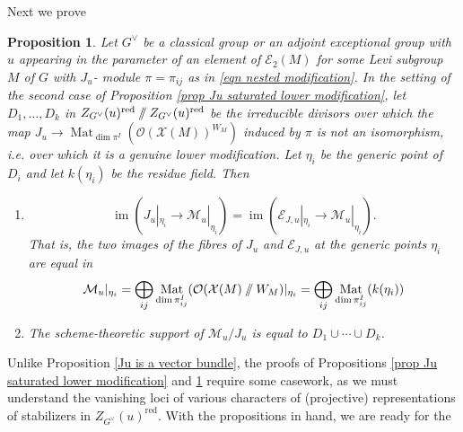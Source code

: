 \documentclass[10pt]{article}
\DeclareMathOperator{\im}{\mathrm{im}}
\DeclareMathOperator{\Mat}{Mat}
\newcommand{\git}{\mathbin{
  \mathchoice{/\mkern-6mu/}%
    {/\mkern-6mu/}%
    {/\mkern-5mu/}%
    {/\mkern-5mu/}}}%
\newcommand{\X}{\mathcal{X}}
\newcommand{\Ee}{\mathcal{E}}
\newcommand{\Oo}{\mathcal{O}}
\newtheorem{prop}{Proposition}
\theoremstyle{definition}
\theoremstyle{remark}
\newcommand{\Zur}{Z_{G^\vee}(u)^{\mathrm{red}}}
\newcommand{\mMu}{\mathcal{M}_u}
\begin{document}
%
Next we prove
%
\begin{prop}
\label{prop Ju and EJu fibre images agree at generic points}
Let $G^\vee$ be a classical group or an adjoint exceptional group with $u$ appearing in the parameter of
an element of $\Ee_2(M)$ for some Levi subgroup $M$ of $G$ with $J_u$-
module $\pi=\pi_{ij}$ as in \eqref{eqn nested modification}.
In the setting of the second case of Proposition \ref{prop Ju saturated lower modification},
let $D_1,\dots, D_k$ 
in $\Zur\git\Zur$ be the irreducible divisors over which
the map 
$J_u\to\Mat_{\dim\pi^I}(\Oo(\X(M))^{W_M})$ induced by $\pi$ is not an isomorphism, \textit{i.e.} over which it 
is a genuine lower modification. Let $\eta_i$ be the generic point of $D_i$ and let $k(\eta_i)$ be the residue 
field. Then
%
\begin{enumerate}
\item[(a)] 
%
\[
\im\left(J_{u}|_{\eta_i}\to\mMu|_{\eta_i}\right)=\im\left(\mathcal{E}_{J,u}|_{\eta_i}\to\mMu|_{\eta_i}\right).
\]
%
That is, the two images of the fibres of $J_u$ and $\mathcal{E}_{J,u}$ at the generic points 
$\eta_i$ are equal in 
%
\[
\mMu|_{\eta_i}=\bigoplus_{ij}\Mat_{\dim\pi^I_{ij}}(\Oo(\X(M)\git W_M)|_{\eta_i}=\bigoplus_{ij}
\Mat_{\dim\pi^I_{ij}}(k(\eta_i))
\]
%
\item[(b)]
The scheme-theoretic support of $\mathcal{M}_u/J_u$ is equal to $D_1\cup\cdots\cup D_k$.
\end{enumerate}
%
\end{prop}
%
Unlike Proposition \ref{Ju is a vector bundle}, the proofs of Propositions \ref{prop Ju saturated lower modification} and \ref{prop Ju and EJu fibre images agree at generic points} require some casework, as we must understand the vanishing loci of various characters of (projective) representations of stabilizers in $\Zur$.
With the propositions in hand, we are ready for the 
\end{document}
